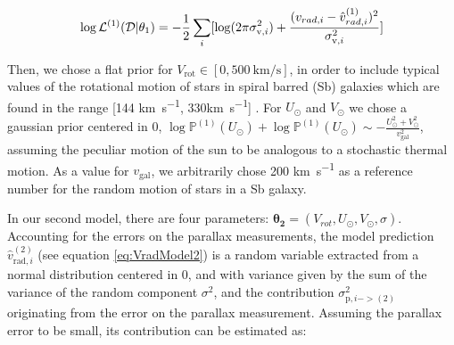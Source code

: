 \begin{equation}\label{Eq:LogLikeMod1}
    \log \mathcal{L}^{(1)}(\mathcal{D} \vert \theta_1) = -\frac{1}{2}\sum_i[\log(2\pi\sigma_{\text{v},i}^2)+\frac{(v_{rad,i} - \hat{v}_{rad,i}^{(1)})^2}{\sigma_{\text{v},i}^2}]
\end{equation}

Then, we chose a flat prior for $V_{\text{rot}}\in[0,\qty{500}{\kilo\meter\per\second}]$, 
in order to include typical values of the rotational motion of stars in spiral barred (Sb) galaxies which are found in the range [144 \unit{\kilo\meter\per\second}, 330\unit{\kilo\meter\per\second}] \cite{Schneider2015}. 
For $U_\odot$ and $V_\odot$ we chose a gaussian prior centered in 0, $\log\mathbb{P}^{(1)}(U_\odot) + \log\mathbb{P}^{(1)}(U_\odot) \sim - \frac{U_\odot^2 + V_{\odot}^2}{v_{\text{gal}}^2}$, assuming the peculiar motion of the sun to be analogous to a stochastic thermal motion. 
As a value for $v_{\text{gal}}$, we arbitrarily chose 200 \unit{\kilo\meter\per\second} as a reference number for the random motion of stars in a Sb galaxy.

In our second model, there are four parameters: $\mathbf{\theta_2} = (V_{rot}, U_{\odot}, V_{\odot}, \sigma)$. 
Accounting for the errors on the parallax measurements, the model prediction $\hat{v}^{(2)}_{\text{rad}, i}$ (see equation \ref{eq:VradModel2}) is a random variable extracted from a normal distribution centered in 0, and with variance given by the sum of the variance of the random component $\sigma^2$, and the contribution $\sigma^2_{\text{p}, i -> (2)}$ originating from the error on the parallax measurement. Assuming the parallax error to be small, its contribution can be estimated as:

